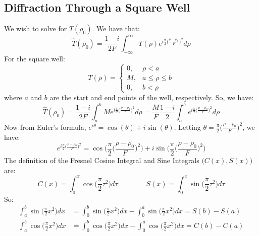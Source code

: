 \documentclass[crop=false,class=book,oneside]{standalone}
\begin{document}
        \subsection{Diffraction Through a Square Well}
            We wish to solve for $\hat{T}(\rho_{0})$. We have that:
            \begin{equation*}
            \hat{T}(\rho_0) = \frac{1-i}{2F}\int_{-\infty}^{\infty}T(\rho)e^{i\frac{\pi}{2}\big(\frac{\rho-\rho_0}{F}\big)^2}d\rho
            \end{equation*}
            For the square well:
            \begin{equation*}
            T(\rho) = \begin{cases} 0, & \rho<a \\ M, & a \leq \rho \leq b \\ 0, & b < \rho\end{cases}
            \end{equation*}
            where $a$ and $b$ are the start and end points of the well, respectively. So, we have:
            \begin{equation*}
            \hat{T}(\rho_0) = \frac{1-i}{2F}\int_{a}^{b}Me^{i\frac{\pi}{2}\big(\frac{\rho-\rho_0}{F}\big)^2}d\rho = \frac{M}{F}\frac{1-i}{2}\int_{a}^{b}e^{i\frac{\pi}{2}\big(\frac{\rho-\rho_0}{F}\big)^2}d\rho
            \end{equation*}
            Now from Euler's formula, $e^{i\theta} = \cos(\theta)+i\sin(\theta).$ Letting $\theta = \frac{\pi}{2}\big(\frac{\rho-\rho_0}{F}\big)^2$, we have:
            \begin{equation*}
            e^{i\frac{\pi}{2}\big(\frac{\rho-\rho_0}{F}\big)^2} = \cos\bigg(\frac{\pi}{2}\big(\frac{\rho-\rho_0}{F}\big)^2\bigg)+i\sin\bigg(\frac{\pi}{2}\big(\frac{\rho-\rho_0}{F}\big)^2\bigg)
            \end{equation*}
            The definition of the Fresnel Cosine Integral and Sine Integrals $\big(C(x),S(x)\big)$ are:
            \begin{equation*}
            C(x) = \int_{0}^{x} \cos\big(\frac{\pi}{2}\tau^2\big)d\tau \quad\quad\quad\quad S(x) = \int_{0}^{x} \sin\big(\frac{\pi}{2}\tau^2\big)d\tau
            \end{equation*}
            So:
            \begin{align*}
            \int_{a}^{b} \sin\bigg(\frac{\pi}{2}x^2\bigg)dx &= \int_{0}^{b}\sin\bigg(\frac{\pi}{2}x^2\bigg)dx - \int_{0}^{a}\sin\bigg(\frac{\pi}{2}x^2\bigg)dx = S(b) - S(a) \\
            \int_{a}^{b} \cos\bigg(\frac{\pi}{2}x^2\bigg)dx &= \int_{0}^{b} \cos\bigg(\frac{\pi}{2}x^2\bigg)dx - \int_{0}^{a}\cos\bigg(\frac{\pi}{2}x^2\bigg)dx = C(b) - C(a)
            \end{align*}
\end{document}
